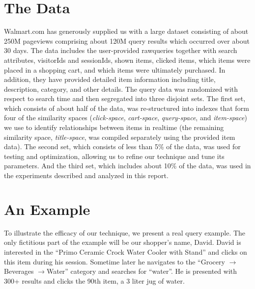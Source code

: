 \documentclass{article}
\begin{document}
\section{The Data}

Walmart.com has generously supplied us with a large dataset consisting of about
250M pageviews comprising about 120M query results which occurred over about 30
days. The data includes the user-provided rawqueries together with search
attributes, visitorIds and sessionIds, shown items, clicked items, which items
were placed in a shopping cart, and which items were ultimately purchased. In
addition, they have provided detailed item information including title,
description, category, and other details. The query data was randomized with
respect to search time and then segregated into three disjoint sets. The first
set, which consists of about half of the data, was re-structured into indexes
that form four of the similarity spaces ({\em click-space}, {\em cart-space},
{\em query-space}, and {\em item-space}) we use to identify relationships
between items in realtime (the remaining similarity space, {\em title-space},
was compiled separately using the provided item data). The second set, which
consists of less than 5\% of the data, was used for testing and optimization,
allowing us to refine our technique and tune its parameters. And the third set,
which includes about 10\% of the data, was used in the experiments described and
analyzed in this report.

\section{An Example}

To illustrate the efficacy of our technique, we present a real query example.
The only fictitious part of the example will be our shopper's name, David.
David is interested in the ``Primo Ceramic Crock Water Cooler with Stand'' and
clicks on this item during his session. Sometime later he navigates to the
``Grocery $\rightarrow $Beverages $\rightarrow $Water'' category and searches
for ``water''. He is presented with 300+ results and clicks the 90th item, a 3 liter
jug of water.
\end{document}
